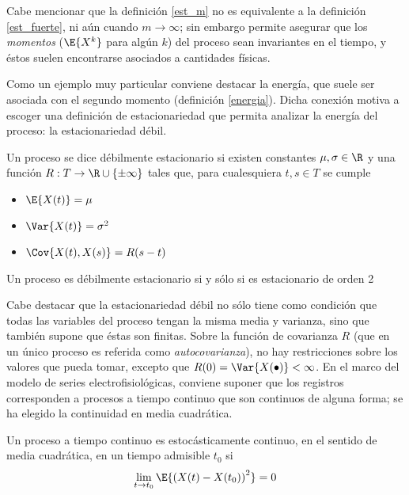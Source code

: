 Cabe mencionar que la definición \ref{est_m} no es equivalente a la definición \ref{est_fuerte}, ni
aún cuando $m\rightarrow \infty$; sin embargo permite asegurar que los \textit{momentos} 
($\E{X^{k}}$ para algún $k$) del proceso sean invariantes en el tiempo, y éstos suelen encontrarse
asociados a cantidades físicas.

Como un ejemplo muy particular conviene destacar la energía, que suele ser asociada con el segundo
momento (definición \ref{energia}). 
%
Dicha conexión motiva a escoger una definición de estacionariedad que permita analizar la energía 
del proceso: la estacionariedad débil.

\begin{definicion}
Un proceso \xt se dice débilmente estacionario si existen constantes $\mu, \sigma \in \R$ y una 
función $R : T \rightarrow \R \cup \{ \pm \infty \} $ tales que, para cualesquiera $t, s \in T$ se 
cumple
\begin{itemize}
\item $\E{X(t)} = \mu$
\item $\Var{X(t)} = \sigma^{2}$
\item $\Cov{X(t),X(s)} = R(s-t)$
\end{itemize}
\end{definicion}

\begin{proposicion}
Un proceso es débilmente estacionario si y sólo si es estacionario de orden 2
\end{proposicion}

Cabe destacar que la estacionariedad débil no sólo tiene como condición que todas las variables del
proceso tengan la misma media y varianza, sino que también supone que éstas son finitas.
%
Sobre la función de covarianza $R$ (que en un único proceso es referida como \textit{autocovarianza}),
no hay restricciones sobre los valores que pueda tomar, excepto que 
$R(0) = \Var{X(\bullet)} < \infty$. 
%
En el marco del modelo de series electrofisiológicas, conviene suponer que los registros 
corresponden a procesos a tiempo continuo que son continuos de alguna forma; se ha elegido la 
continuidad en media cuadrática.


\begin{definicion}
Un proceso a tiempo continuo \xt es estocásticamente continuo, en el sentido de media cuadrática, 
en un tiempo admisible $t_0$ si
\begin{equation*}
\lim_{t \rightarrow t_0} \E{\left( X(t) - X(t_0) \right)^{2}} = 0
\end{equation*}
\label{cont_est}
\end{definicion}

